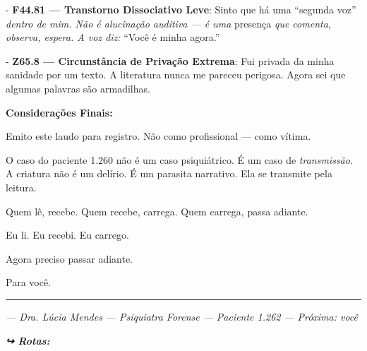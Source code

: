 \noindent - \textbf{F44.81 --- Transtorno Dissociativo Leve}: Sinto que há uma \textquotedblleft{}segunda voz\textquotedblright{\textit{ dentro de mim. Não é alucinação auditiva --- é uma }presença\textit{ que comenta, observa, espera. A voz diz: }\textquotedblleft{}Você é minha agora.\textquotedblright{}}

\noindent - \textbf{Z65.8 --- Circunstância de Privação Extrema}: Fui privada da minha sanidade por um texto. A literatura nunca me pareceu perigosa. Agora sei que algumas palavras são armadilhas.

\noindent \textbf{Considerações Finais:}

\noindent Emito este laudo para registro. Não como profissional --- como vítima.

\noindent O caso do paciente 1.260 não é um caso psiquiátrico. É um caso de \textit{transmissão}. A criatura não é um delírio. É um parasita narrativo. Ela se transmite pela leitura.

\noindent Quem lê, recebe.
Quem recebe, carrega.
Quem carrega, passa adiante.

\noindent Eu li.
Eu recebi.
Eu carrego.

\noindent Agora preciso passar adiante.

\noindent Para você.

\vspace{0.5em}\noindent\rule{\textwidth}{0.5pt}\vspace{0.5em}

\noindent \textit{--- Dra. Lúcia Mendes}
\textit{--- Psiquiatra Forense}
\textit{--- Paciente 1.262}
\textit{--- Próxima: você}

\vspace{0.5em}
\noindent\textit{\textbf{↪ Rotas:}  \rotasep {}}